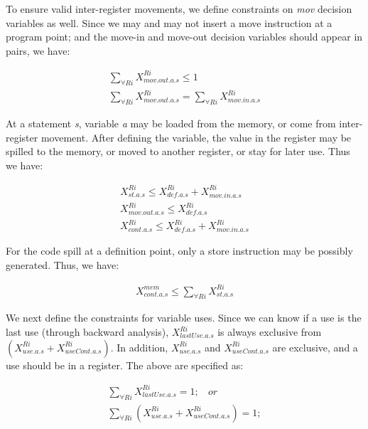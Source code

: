 To ensure valid inter-register movements, we define constraints on
{\it mov} decision variables as well. Since we may and may not insert
a move instruction at a program point; and the move-in and move-out
decision variables should appear in pairs, we have:

\begin{small}
\begin{eqnarray}
\sum_{\forall Ri} X_{mov.out.a.s}^{Ri} \leq 1  \nonumber \\
\sum_{\forall Ri} X_{mov.out.a.s}^{Ri} = \sum_{\forall Ri} X_{mov.in.a.s}^{Ri}
\end{eqnarray}
\end{small}

At a statement {\it s}, variable {\it a} may be loaded from the
memory, or come from inter-register movement. After defining the
variable, the value in the register may be spilled to the memory, or
moved to another register, or stay for later use. Thus we have:

\begin{small}
\begin{eqnarray}
X_{st.a.s}^{Ri} \leq X_{def.a.s}^{Ri} + X_{mov.in.a.s}^{Ri} \nonumber \\
X_{mov.out.a.s}^{Ri} \leq X_{def.a.s}^{Ri}  \nonumber \\
X_{cont.a.s}^{Ri} \leq X_{def.a.s}^{Ri} + X_{mov.in.a.s}^{Ri} 
\end{eqnarray}
\end{small}

For the code spill at a definition point, only a store instruction may
be possibly generated. Thus, we have:

\begin{small}
\begin{eqnarray}
X_{cont.a.s}^{mem} \leq \sum_{\forall Ri}X_{st.a.s}^{Ri}
\end{eqnarray}
\end{small}

We next define the constraints for variable uses. Since we can know if
a use is the last use (through backward analysis),
$X_{lastUse.a.s}^{Ri}$ is always exclusive from
$(X_{use.a.s}^{Ri}+X_{useCont.a.s}^{Ri})$. In addition,
$X_{use.a.s}^{Ri}$ and $X_{useCont.a.s}^{Ri}$ are exclusive, and a use
should be in a register. The above are specified as:

\begin{small}
\begin{eqnarray}
\sum_{\forall Ri} X_{lastUse.a.s}^{Ri} = 1;  ~~~~or \nonumber \\
\sum_{\forall Ri} (X_{use.a.s}^{Ri} + X_{useCont.a.s}^{Ri}) = 1;
\end{eqnarray}
\end{small}

